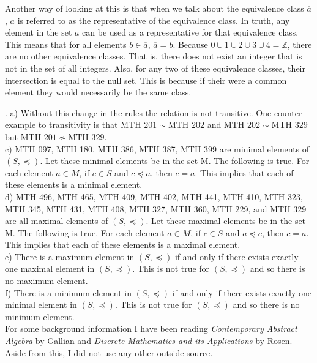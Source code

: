 \documentclass[12pt]{article}
\begin{document}
Another way of looking at this is that when we talk about the equivalence class $\overline{a}$, $a$ is referred to as the representative of the equivalence class. In truth, any element in the set $\overline{a}$ can be used as a representative for that equivalence class. This means that for all elements $b \in \overline{a}$, $\overline{a}=\overline{b}$. Because $\overline{0}\cup\overline{1}\cup\overline{2}\cup\overline{3}\cup\overline{4} = \mathbb{Z}$, there are no other equivalence classes. That is, there does not exist an integer that is not in the set of all integers. Also, for any two of these equivalence classes, their intersection is equal to the null set. This is because if their were a common element they would necessarily be the same class.

\newpage

. a) Without this change in the rules the relation is not transitive. One counter example to transitivity is that $\text{MTH } 201\sim \text{MTH } 202$ and $\text{MTH } 202 \sim \text{MTH } 329$ but $\text{MTH } 201 \nsim \text{MTH } 329$.\\

\noindent c) MTH 097, MTH 180, MTH 386, MTH 387, MTH 399 are minimal elements of $(S,\preccurlyeq)$. Let these minimal elements be in the set M. The following is true. For each element $a\in M$, if $c \in S$ and $c \preccurlyeq a$, then $c = a$.  This implies that each of these elements is a minimal element.\\

\noindent d) MTH 496, MTH 465, MTH 409, MTH 402, MTH 441, MTH 410, MTH 323, MTH 345, MTH 431, MTH 408, MTH 327, MTH 360, MTH 229, and MTH 329 are all maximal elements of $(S, \preccurlyeq)$. Let these maximal elements be in the set M. The following is true. For each element $a\in M$, if $c \in S$ and $a \preccurlyeq c$, then $c = a$.  This implies that each of these elements is a maximal element.\\

\noindent e) There is a maximum element in $(S,\preccurlyeq)$ if and only if there exists exactly one maximal element in $(S,\preccurlyeq)$. This is not true for $(S,\preccurlyeq)$ and so there is no maximum element.\\

\noindent f) There is a minimum element in $(S,\preccurlyeq)$ if and only if there exists exactly one minimal element in $(S,\preccurlyeq)$. This is not true for $(S,\preccurlyeq)$ and so there is no minimum element.\\


For some background information I have been reading {\it Contemporary Abstract Algebra} by Gallian and {\it Discrete Mathematics and its Applications} by Rosen. Aside from this, I did not use any other outside source.
\end{document}
